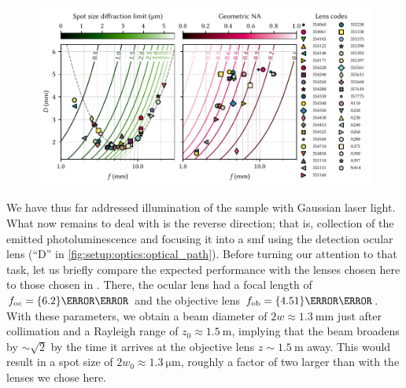 \begin{figure}
    \centering
    \includegraphics{img/pdf/setup/choosing}
    \caption[]{
    }
    \label{fig:setup:optics:coupling:lenses}
\end{figure}

We have thus far addressed illumination of the sample with Gaussian laser light.
What now remains to deal with is the reverse direction; that is, collection of the emitted photoluminescence and focusing it into a \gls{smf} using the detection ocular lens (\enquote{D} in \cref{fig:setup:optics:optical_path}).
Before turning our attention to that task, let us briefly compare the expected performance with the lenses chosen here to those chosen in .
There, the ocular lens had a focal length of $\foc = \qty{6.2}{\milli\meter}$ and the objective lens $\fob = \qty{4.51}{\milli\meter}$.
With these parameters, we obtain a beam diameter of $2w \approx\qty{1.3}{\milli\meter}$ just after collimation and a Rayleigh range of $z_0\approx\qty{1.5}{\meter}$, implying that the beam broadens by $\sim\sqrt{2}$ by the time it arrives at the objective lens $z\sim\qty{1.5}{\meter}$ away.
This would result in a spot size of $2 w_0\approx\qty{1.3}{\micro\meter}$, roughly a factor of two larger than with the lenses we chose here.

